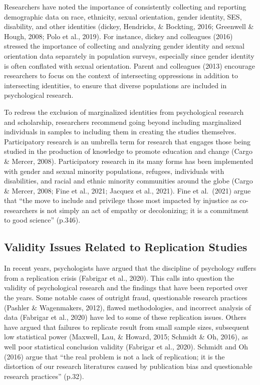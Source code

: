 \documentclass[
  11pt,
]{book}
\begin{document}
Researchers have noted the importance of consistently collecting and reporting demographic data on race, ethnicity, sexual orientation, gender identity, SES, disability, and other identities (dickey, Hendricks, \& Bockting, 2016; Greenwell \& Hough, 2008; Polo et al., 2019). For instance, dickey and colleagues (2016) stressed the importance of collecting and analyzing gender identity and sexual orientation data separately in population surveys, especially since gender identity is often conflated with sexual orientation. Parent and colleagues (2013) encourage researchers to focus on the context of intersecting oppressions in addition to intersecting identities, to ensure that diverse populations are included in psychological research.

To redress the exclusion of marginalized identities from psychological research and scholarship, researchers recommend going beyond including marginalized individuals in samples to including them in creating the studies themselves. Participatory research is an umbrella term for research that engages those being studied in the production of knowledge to promote education and change (Cargo \& Mercer, 2008). Participatory research in its many forms has been implemented with gender and sexual minority populations, refugees, individuals with disabilities, and racial and ethnic minority communities around the globe (Cargo \& Mercer, 2008; Fine et al., 2021; Jacquez et al., 2021). Fine et al.~(2021) argue that ``the move to include and privilege those most impacted by injustice as co-researchers is not simply an act of empathy or decolonizing; it is a commitment to good science'' (p.346).

\subsection{Validity Issues Related to Replication Studies}\label{validity-issues-related-to-replication-studies}

In recent years, psychologists have argued that the discipline of psychology suffers from a replication crisis (Fabrigar et al., 2020). This calls into question the validity of psychological research and the findings that have been reported over the years. Some notable cases of outright fraud, questionable research practices (Pashler \& Wagenmakers, 2012), flawed methodologies, and incorrect analysis of data (Fabrigar et al., 2020) have led to some of these replication issues. Others have argued that failures to replicate result from small sample sizes, subsequent low statistical power (Maxwell, Lau, \& Howard, 2015; Schmidt \& Oh, 2016), as well poor statistical conclusion validity (Fabrigar et al., 2020). Schmidt and Oh (2016) argue that ``the real problem is not a lack of replication; it is the distortion of our research literatures caused by publication bias and questionable research practices'' (p.32).
\end{document}
